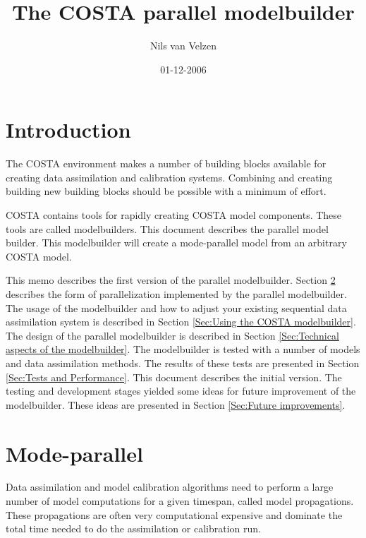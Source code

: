 \documentclass[a4paper,12pt]{article}
\title{The COSTA parallel modelbuilder}
\author{Nils van Velzen}
\date{01-12-2006}
\begin{document}
\memotitlepage

\begin{vtlogsheet}
\end{vtlogsheet}

\tableofcontents
\section{Introduction}
The COSTA environment makes a number of building blocks available for
creating data assimilation and calibration systems. Combining and creating
building new building blocks should be possible with a minimum of effort.

COSTA contains tools for rapidly creating COSTA model components. These
tools are called modelbuilders. This document describes the parallel model
builder. This modelbuilder will create a mode-parallel model from an
arbitrary COSTA model.

This memo describes the first version of the parallel modelbuilder.
Section \ref{Sec:Mode-parallel} describes the form of parallelization
implemented by the parallel modelbuilder. The usage of the modelbuilder
and how to adjust your existing sequential data assimilation system is
described in Section \ref{Sec:Using the COSTA modelbuilder}. The design
of the parallel modelbuilder is described in Section 
\ref{Sec:Technical aspects of the modelbuilder}. The modelbuilder is
tested with a number of models and data assimilation methods. The results
of these tests are presented in Section \ref{Sec:Tests and Performance}.
This document describes the initial version. The testing and development
stages yielded some ideas for future improvement of the modelbuilder.
These ideas are presented in Section \ref{Sec:Future improvements}.



\section{Mode-parallel} \label{Sec:Mode-parallel}
Data assimilation and model calibration algorithms need to perform a large
number of model computations for a given timespan, called model
propagations. These propagations are often very computational expensive and
dominate the total time needed to do the assimilation or calibration run.
\end{document}
